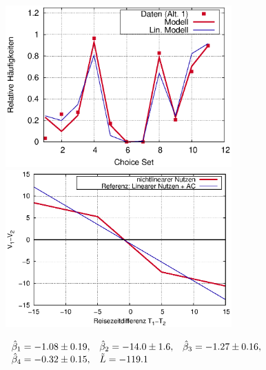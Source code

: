 \documentclass[a4paper]{foils}
\begin{document}
\begin{landscape}
\begin{center}
\vspace{1ex}

\parbox{1.39\textwidth}{
 \includegraphics[width=0.65\textwidth]
   {figsDiscr/nonlinUtility_statedChoiceWS1213_quasi_fProb.eps}
 \includegraphics[width=0.65\textwidth]
   {figsDiscr/nonlinUtility_statedChoiceWS1213_quasi_Vfun.eps}
}

\vspace{1ex}

 $
 \begin{array}{lll}
\hat{\beta}_1=-1.08 \pm 0.19, &
\hat{\beta}_2=-14.0 \pm 1.6, &
\hat{\beta}_3=-1.27 \pm 0.16, \\
\hat{\beta}_4=-0.32 \pm 0.15,&
\tilde{L}=-119.1
 \end{array}
 $


\newpage
\\[0em]

\newpage
\\[0em]


\end{center}
\end{landscape}
\end{document}
